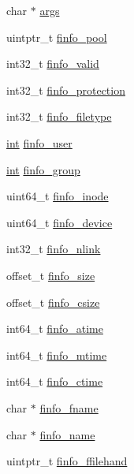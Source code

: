 \begin{DoxyCompactItemize}
\item 
char $\ast$ \hyperlink{structrequest__rec_ad05e275008cdfe1865e02e8774541611}{args}
\item 
uintptr\+\_\+t \hyperlink{structrequest__rec_a95929822e34571f3043a696c7da7610f}{finfo\+\_\+pool}
\item 
int32\+\_\+t \hyperlink{structrequest__rec_a27f04ee425af97604764a90f21ff1e1e}{finfo\+\_\+valid}
\item 
int32\+\_\+t \hyperlink{structrequest__rec_af3baddbe2fc26b6d9692bf6f7f6895c0}{finfo\+\_\+protection}
\item 
int32\+\_\+t \hyperlink{structrequest__rec_a3bd1bfdb62762492a1401803b4312540}{finfo\+\_\+filetype}
\item 
\hyperlink{pcre_8txt_a42dfa4ff673c82d8efe7144098fbc198}{int} \hyperlink{structrequest__rec_a1c4ff079778ece80f08018b12e1409bc}{finfo\+\_\+user}
\item 
\hyperlink{pcre_8txt_a42dfa4ff673c82d8efe7144098fbc198}{int} \hyperlink{structrequest__rec_a175238f53df866dc25d76a090c468ba8}{finfo\+\_\+group}
\item 
uint64\+\_\+t \hyperlink{structrequest__rec_a4049430d313d555e563340a60e4bb3ae}{finfo\+\_\+inode}
\item 
uint64\+\_\+t \hyperlink{structrequest__rec_a0db15900b6d96da671db113282a883b7}{finfo\+\_\+device}
\item 
int32\+\_\+t \hyperlink{structrequest__rec_a8d194dc9f82e6eef45f85932d9ed1756}{finfo\+\_\+nlink}
\item 
offset\+\_\+t \hyperlink{structrequest__rec_a95a5399a67fd6f944a491a74cba3ae86}{finfo\+\_\+size}
\item 
offset\+\_\+t \hyperlink{structrequest__rec_a25b260145311ac56f986a7dcafd61f25}{finfo\+\_\+csize}
\item 
int64\+\_\+t \hyperlink{structrequest__rec_a34dc3cebb04ef7b798d2bc31dc52c57d}{finfo\+\_\+atime}
\item 
int64\+\_\+t \hyperlink{structrequest__rec_ac2992c3df275652d3e1421073cfc329b}{finfo\+\_\+mtime}
\item 
int64\+\_\+t \hyperlink{structrequest__rec_ad3602a34fc4141625efe0971c0c3fb67}{finfo\+\_\+ctime}
\item 
char $\ast$ \hyperlink{structrequest__rec_a5ee0d92fdd31425f4274431018c0a930}{finfo\+\_\+fname}
\item 
char $\ast$ \hyperlink{structrequest__rec_a2d9f441c6242dced0d59b70e9c61e03b}{finfo\+\_\+name}
\item 
uintptr\+\_\+t \hyperlink{structrequest__rec_a29f1365ffe28a19b94a62d21b7688289}{finfo\+\_\+ffilehand}

\end{DoxyCompactItemize}

